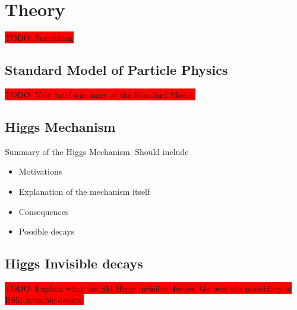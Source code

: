 \chapter{Theory}

\colorbox{red}{TODO: Something}

\section{Standard Model of Particle Physics}

\colorbox{red}{TODO: Very brief summary of the Standard Model.}


\section{Higgs Mechanism}

Summary of the Higgs Mechanism. Should include
\begin{itemize}
 \item Motivations 
 \item Explanation of the mechanism itself
 \item Consequences 
 \item Possible decays
\end{itemize}

\section{Higgs Invisible decays}

\colorbox{red}{TODO: Explain what are SM Higgs invisible decays. Go over the possibility of BSM invisible decays.}
